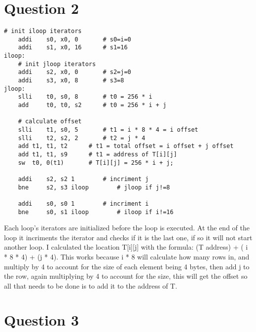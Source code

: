 \documentclass[12pt,letterpaper]{article}
\begin{document}
\newpage

\section*{Question 2}



     \begin{lstlisting}[style = Python]
	# init iloop iterators
	addi 	s0, x0, 0		# s0=i=0
	addi 	s1, x0, 16		# s1=16
iloop:
	# init jloop iterators
	addi 	s2, x0, 0		# s2=j=0
	addi 	s3, x0, 8		# s3=8
jloop:
	slli	t0, s0, 8		# t0 = 256 * i
	add 	t0, t0, s2		# t0 = 256 * i + j
	
	# calculate offset
	slli	t1, s0, 5		# t1 = i * 8 * 4 = i offset
	slli	t2, s2, 2		# t2 = j * 4
	add	t1, t1, t2		# t1 = total offset = i offset + j offset
	add	t1, t1, s9		# t1 = address of T[i][j]
	sw	t0, 0(t1)		# T[i][j] = 256 * i + j;

	addi	s2, s2 1		# incriment j
	bne 	s2, s3 iloop		# jloop if j!=8
	
	addi	s0, s0 1		# incriment i
	bne 	s0, s1 iloop		# iloop if i!=16

    \end{lstlisting}
Each loop's iterators are initialized before the loop is executed. At the end of the loop it incriments the iterator and checks if it is the last one, if so it will not start another loop. I calculated the location T[i][j] with the formula: (T address) + ( i * 8 * 4) + (j * 4). This works because i * 8 will calculate how many rows in, and multiply by 4 to account for the size of each element being 4 bytes, then add j to the row, again multiplying by 4 to account for the size, this will get the offset so all that needs to be done is to add it to the address of T.

\newpage
\section*{Question 3}
\end{document}
